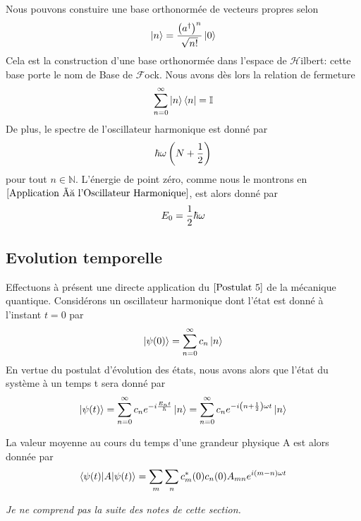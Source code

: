 \documentclass[../Notesdecours.tex]{subfiles}
\begin{document}
Nous pouvons constuire une base orthonormée de vecteurs propres selon 
\begin{equation}
    \ket{n} = \frac{\left(a^\dagger\right)^n}{\sqrt{n!}}\ket{0}
\end{equation}
Cela est la construction d'une base orthonormée dans l'espace de $\mathcal{H}$ilbert: cette base porte le nom de Base de $\mathcal{F}$ock. Nous avons dès lors la relation de fermeture
\begin{equation}
    \sum_{n = 0}^{\infty} \ket{n}\bra{n} = \mathbb{I}
\end{equation}
De plus, le spectre de l'oscillateur harmonique est donné par 
\begin{equation}
    \hbar\omega\left(N+\frac{1}{2}\right)
\end{equation}
pour tout $n\in\mathbb{N}$. L'énergie de point zéro, comme nous le montrons en $\ref{Application à l'Oscillateur Harmonique}$, est alors donné par
\begin{equation}
    E_0 = \frac{1}{2}\hbar\omega
\end{equation}

\subsection{Evolution temporelle}
Effectuons à présent une directe application du $\ref{Postulat 5}$ de la mécanique quantique. Considérons un oscillateur harmonique dont l'état est donné à l'instant $t = 0$ par
\begin{equation}
    \ket{\psi (0)} = \sum_{n = 0}^{\infty} c_n\ket{n}
\end{equation}
En vertue du postulat d'évolution des états, nous avons alors que l'état du système à un temps t sera donné par
\begin{equation}
    \ket{\psi (t)} = \sum_{n = 0}^{\infty} c_n e^{-i \frac{E_n t}{\hbar}}\ket{n} = \sum_{n = 0}^{\infty} c_n e^{-i\left(n+\frac{1}{2}\right)\omega t}\ket{n}
\end{equation}

La valeur moyenne au cours du temps d'une grandeur physique A est alors donnée par
\begin{equation}
    \braket{\psi(t)|A|\psi(t)} = \sum_m \sum_n c_m^* (0)c_n (0)A_{mn}e^{i\left(m-n\right)\omega t}
\end{equation}

\color{red} \textit{Je ne comprend pas la suite des notes de cette section.}

\color{black}
\end{document}
